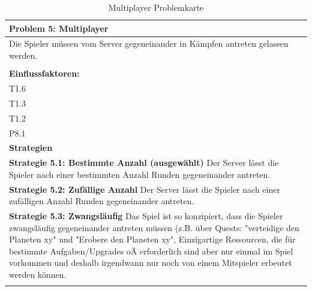 \documentclass[fontsize=12pt,paper=a4,twoside]{scrartcl}
\begin{document}
\begin{table}[H]
    \centering
    \begin{tabular}{|p{15cm}|}
    \hline
          \textbf{Problem 5: Multiplayer}  \\ \hline
	Die Spieler müssen vom Server gegeneinander in Kämpfen antreten gelassen werden. \\
         \\ \hline
          \textbf{Einflussfaktoren: } \\
	T1.6 \\
	T1.3 \\
	T1.2 \\
	P8.1 \\
          \hline
          \textbf{Strategien} \\ \hline
            {}          
           \label{strategie:5.1}     
          \textbf{Strategie 5.1: Bestimmte Anzahl (ausgewählt)}  Der Server lässt die Spieler nach einer bestimmten Anzahl Runden gegeneinander antreten. \\        
  {}          
           \label{strategie:5.2}              
          \textbf{Strategie 5.2: Zufällige Anzahl} Der Server lässt die Spieler nach einer zufälligen Anzahl Runden gegeneinander antreten.   \\
	 {}          
           \label{strategie:5.3}     
          \textbf{Strategie 5.3: Zwangsläufig} Das Spiel ist so konzipiert, dass die Spieler zwangsläufig gegeneinander antreten müssen (z.B. über Quests: "verteidige den Planeten xy" und "Erobere den Planeten xy", Einzigartige Ressourcen, die für bestimmte Aufgaben/Upgrades oÄ erforderlich sind aber nur einmal im Spiel vorkommen und deshalb irgendwann nur noch von einem Mitspieler erbeutet werden können.  \\ 
	 \\ \hline
    \end{tabular}

    \caption{Multiplayer Problemkarte}
    \label{tab:ProblemKarte5}
\end{table}
\end{document}
